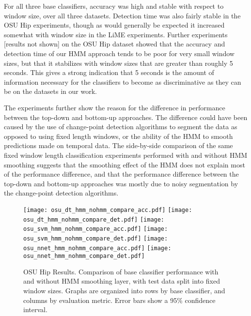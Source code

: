For all three base classifiers, accuracy was high and
stable with respect to window size, over all three datasets. Detection
time was also fairly stable in the OSU Hip experiments, though as would
generally be expected it increased somewhat with window size in the LiME
experiments. Further experiments [results not shown] on the
OSU Hip dataset showed that the accuracy and detection time of our HMM approach 
tends to be poor for very small window sizes, but that it stabilizes with window sizes
that are greater than roughly 5 seconds. This gives a strong indication that
5 seconds is the amount of information necessary for the classifiers to become as
discriminative as they can be on the datasets in our work.

The experiments further show the reason for the difference in
performance between the top-down and bottom-up approaches. 
The difference could have been caused by the
use of change-point detection algorithms to segment the data as opposed to using
fixed length windows, or the ability of the HMM
to smooth predictions made on temporal data. The side-by-side comparison of the
same fixed window length classification experiments performed with and without HMM smoothing
suggests that the smoothing effect of the HMM
does not explain most of the performance difference, and that the performance difference between the top-down
and bottom-up approaches was mostly due to noisy segmentation by the change-point
detection algorithms.

 
\begin{figure}[H]
 \centering
 \texttt{[image: osu\_dt\_hmm\_nohmm\_compare\_acc.pdf]} \hspace{1em}\vspace{1em}
 \texttt{[image: osu\_dt\_hmm\_nohmm\_compare\_det.pdf]} 
 \texttt{[image: osu\_svm\_hmm\_nohmm\_compare\_acc.pdf]} \hspace{1em}\vspace{1em}
 \texttt{[image: osu\_svm\_hmm\_nohmm\_compare\_det.pdf]}
 \texttt{[image: osu\_nnet\_hmm\_nohmm\_compare\_acc.pdf]} \hspace{1em}
 \texttt{[image: osu\_nnet\_hmm\_nohmm\_compare\_det.pdf]}
 \caption{OSU Hip Results. Comparison of base classifier performance with and without HMM
  smoothing layer, with test data split into fixed window sizes. Graphs are organized into rows by base
  classifier, and columns by evaluation metric. Error bars show a 95\% confidence interval.}
 \label{fig:osu_hmm}
\end{figure}

